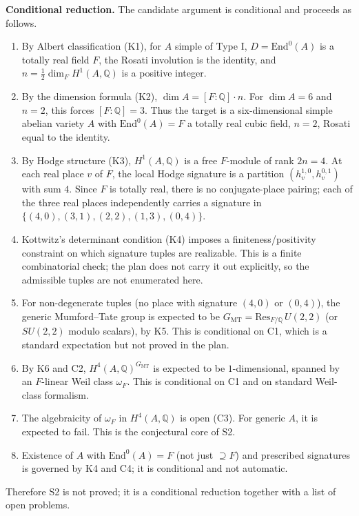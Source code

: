 \documentclass{article}
\begin{document}
\medskip

\noindent\textbf{Conditional reduction.} The candidate argument is conditional
and proceeds as follows.
\begin{enumerate}
  \item By Albert classification (K1), for $A$ simple of Type I,
    $D=\mathrm{End}^0(A)$ is a totally real field $F$, the Rosati involution is
    the identity, and $n=\tfrac12\dim_F H^1(A,\mathbb{Q})$ is a positive
    integer.
  \item By the dimension formula (K2), $\dim A=[F:\mathbb{Q}]\cdot n$. For
    $\dim A=6$ and $n=2$, this forces $[F:\mathbb{Q}]=3$. Thus the target is a
    six-dimensional simple abelian variety $A$ with
    $\mathrm{End}^0(A)=F$ a totally real cubic field, $n=2$, Rosati equal to
    the identity.
  \item By Hodge structure (K3), $H^1(A,\mathbb{Q})$ is a free $F$-module of
    rank $2n=4$. At each real place $v$ of $F$, the local Hodge signature is a
    partition $(h^{1,0}_v,h^{0,1}_v)$ with sum $4$. Since $F$ is totally real,
    there is no conjugate-place pairing; each of the three real places
    independently carries a signature in
    $\{(4,0),(3,1),(2,2),(1,3),(0,4)\}$.
  \item Kottwitz's determinant condition (K4) imposes a finiteness/positivity
    constraint on which signature tuples are realizable. This is a finite
    combinatorial check; the plan does not carry it out explicitly, so the
    admissible tuples are not enumerated here.
  \item For non-degenerate tuples (no place with signature $(4,0)$ or
    $(0,4)$), the generic Mumford--Tate group is expected to be
    $G_{\mathrm{MT}}=\mathrm{Res}_{F/\mathbb{Q}}\,U(2,2)$ (or $SU(2,2)$ modulo
    scalars), by K5. This is conditional on C1, which is a standard expectation
    but not proved in the plan.
  \item By K6 and C2, $H^4(A,\mathbb{Q})^{G_{\mathrm{MT}}}$ is expected to be
    $1$-dimensional, spanned by an $F$-linear Weil class $\omega_F$. This is
    conditional on C1 and on standard Weil-class formalism.
  \item The algebraicity of $\omega_F$ in $H^4(A,\mathbb{Q})$ is open (C3). For
    generic $A$, it is expected to fail. This is the conjectural core of S2.
  \item Existence of $A$ with $\mathrm{End}^0(A)=F$ (not just $\supseteq F$)
    and prescribed signatures is governed by K4 and C4; it is conditional and
    not automatic.
\end{enumerate}
Therefore S2 is not proved; it is a conditional reduction together with a list
of open problems.
\end{document}
